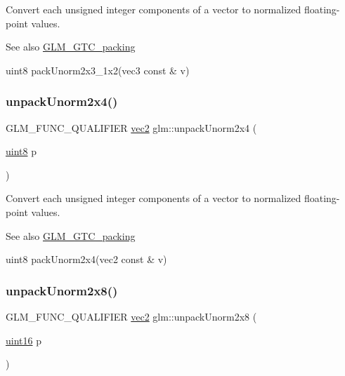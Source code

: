 Convert each unsigned integer components of a vector to normalized floating-\/point values.

\begin{DoxySeeAlso}{See also}
\hyperlink{group__gtc__packing}{G\+L\+M\+\_\+\+G\+T\+C\+\_\+packing} 

uint8 pack\+Unorm2x3\+\_\+1x2(vec3 const \& v) 
\end{DoxySeeAlso}
\mbox{\label{group__gtc__packing_ga3afb0452954320f2d83fe6f38cb24147}} 
\subsubsection{\texorpdfstring{unpack\+Unorm2x4()}{unpackUnorm2x4()}}
{\footnotesize\ttfamily G\+L\+M\+\_\+\+F\+U\+N\+C\+\_\+\+Q\+U\+A\+L\+I\+F\+I\+ER \hyperlink{group__core__types_gaa1618f51db67eaa145db101d8c8431d8}{vec2} glm\+::unpack\+Unorm2x4 (\begin{DoxyParamCaption}\item[{\hyperlink{group__gtc__type__precision_ga1a7dcd8aac97cc8020817c94049deff2}{uint8}}]{p }\end{DoxyParamCaption})}

Convert each unsigned integer components of a vector to normalized floating-\/point values.

\begin{DoxySeeAlso}{See also}
\hyperlink{group__gtc__packing}{G\+L\+M\+\_\+\+G\+T\+C\+\_\+packing} 

uint8 pack\+Unorm2x4(vec2 const \& v) 
\end{DoxySeeAlso}
\mbox{\label{group__gtc__packing_ga96ce0c24339ee676e28a027fffd1edf6}} 
\subsubsection{\texorpdfstring{unpack\+Unorm2x8()}{unpackUnorm2x8()}}
{\footnotesize\ttfamily G\+L\+M\+\_\+\+F\+U\+N\+C\+\_\+\+Q\+U\+A\+L\+I\+F\+I\+ER \hyperlink{group__core__types_gaa1618f51db67eaa145db101d8c8431d8}{vec2} glm\+::unpack\+Unorm2x8 (\begin{DoxyParamCaption}\item[{\hyperlink{group__gtc__type__precision_gad8c2939e1fdd8e5828b31d95c52255d5}{uint16}}]{p }\end{DoxyParamCaption})}

